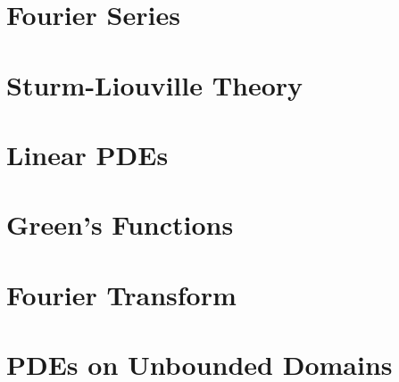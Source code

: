 \documentclass[british,11pt,a4paper]{report}
\begin{document}
\maketitle
\tableofcontents

\chapter{Fourier Series}

\chapter{Sturm-Liouville Theory}
%
\chapter{Linear PDEs}
%
\chapter{Green's Functions}
%
\chapter{Fourier Transform}
%
\chapter{PDEs on Unbounded Domains}
%
\end{document}
